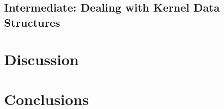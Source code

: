 \documentclass{article}
\begin{document}
\subsection{Intermediate: Dealing with Kernel Data Structures}
\lipsum[1]


\section{Discussion}
\lipsum[1]

\section{Conclusions}
\lipsum[1]


\vspace{-7.5mm}
\renewcommand{\refname}{\section{References}}

\end{document}
